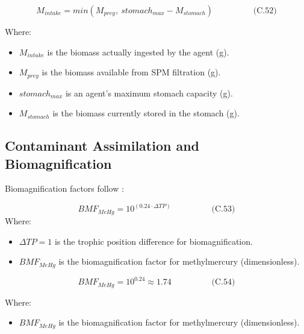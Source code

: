 \documentclass[
]{book}
\providecommand{\tightlist}{%
  \setlength{\itemsep}{0pt}\setlength{\parskip}{0pt}}
\begin{document}
\[
\begin{equation} M_{intake} = min(M_{prey},\ stomach_{max} - M_{stomach})  \hspace{2cm} \text{(C.52)} \end{equation}
\]

Where:

\begin{itemize}
\tightlist
\item
  \(M_{intake}\) is the biomass actually ingested by the agent (g).
\item
  \(M_{prey}\) is the biomass available from SPM filtration (g).
\item
  \(stomach_{max}\) is an agent's maximum stomach capacity (g).
\item
  \(M_{stomach}\) is the biomass currently stored in the stomach (g).
\end{itemize}

\subsection{Contaminant Assimilation and Biomagnification}\label{contaminant-assimilation-and-biomagnification}

Biomagnification factors follow \citet{lavoie_biomagnification_2013}:

\[
\begin{equation} BMF_{MeHg} = 10^{(0.24 \cdot \Delta TP)}  \hspace{2cm} \text{(C.53)} \end{equation}
\] Where:

\begin{itemize}
\tightlist
\item
  \(\Delta TP = 1\) is the trophic position difference for
  biomagnification.
\item
  \(BMF_{MeHg}\) is the biomagnification factor for methylmercury
  (dimensionless).
\end{itemize}

\[
\begin{equation} BMF_{MeHg} = 10^{0.24} \approx 1.74  \hspace{2cm} \text{(C.54)} \end{equation}
\]

Where:

\begin{itemize}
\tightlist
\item
  \(BMF_{MeHg}\) is the biomagnification factor for methylmercury
  (dimensionless).
\end{itemize}
\end{document}
